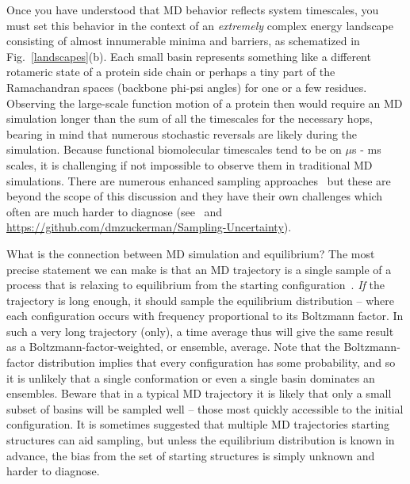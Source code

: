\documentclass[9pt,bestpractices]{livecoms}
\begin{document}
Once you have understood that MD behavior reflects system timescales, you must set this behavior in the context of an \emph{extremely} complex energy landscape consisting of almost innumerable minima and barriers, as schematized in Fig.\ \ref{landscapes}(b).  
Each small basin represents something like a different rotameric state of a protein side chain or perhaps a tiny part of the Ramachandran spaces (backbone phi-psi angles) for one or a few residues.  
Observing the large-scale function motion of a protein then would require an MD simulation longer than the sum of all the timescales for the necessary hops, bearing in mind that numerous stochastic reversals are likely during the simulation.  
Because functional biomolecular timescales tend to be on $\mu$s - ms scales, it is challenging if not impossible to observe them in traditional MD simulations.  
There are numerous enhanced sampling approaches~\cite{Zuckerman:2011:Annu.Rev.Biophys., Chong:2017:CurrentOpinioninStructuralBiology} but these are beyond the scope of this discussion and they have their own challenges which often are much harder to diagnose (see~\cite{Grossfield:2009:AnnuRepComputChem} and  \url{https://github.com/dmzuckerman/Sampling-Uncertainty}).

What is the connection between MD simulation and equilibrium?  The most precise statement we can make is that an MD trajectory is a single sample of a process that is relaxing to equilibrium from the starting configuration~\cite{Zuckerman:2015:StatisticalBiophysicsBlog, Zuckerman:2010:}.  
\emph{If} the trajectory is long enough, it should sample the equilibrium distribution -- where each configuration occurs with frequency proportional to its Boltzmann factor.  
In such a very long trajectory (only), a time average thus will give the same result as a Boltzmann-factor-weighted, or ensemble, average.  
Note that the Boltzmann-factor distribution implies that every configuration has some probability, and so it is unlikely that a single conformation or even a single basin dominates an ensembles. 
Beware that in a typical MD trajectory it is likely that only a small subset of basins will be sampled well -- those most quickly accessible to the initial configuration.  
It is sometimes suggested that multiple MD trajectories starting structures can aid sampling, but unless the equilibrium distribution is known in advance, the bias from the set of starting structures is simply unknown and harder to diagnose.
\end{document}
